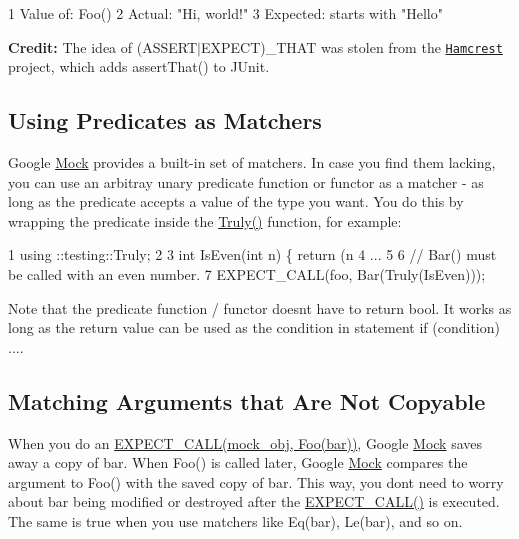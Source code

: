 \begin{DoxyCode}
1 Value of: Foo()
2   Actual: "Hi, world!"
3 Expected: starts with "Hello"
\end{DoxyCode}


{\bfseries Credit\+:} The idea of {\ttfamily (A\+S\+S\+E\+R\+T$\vert$\+E\+X\+P\+E\+CT)\+\_\+\+T\+H\+AT} was stolen from the \href{https://github.com/hamcrest/}{\tt Hamcrest} project, which adds {\ttfamily assert\+That()} to J\+Unit.

\subsection*{Using Predicates as Matchers}

Google \hyperlink{class_mock}{Mock} provides a built-\/in set of matchers. In case you find them lacking, you can use an arbitray unary predicate function or functor as a matcher -\/ as long as the predicate accepts a value of the type you want. You do this by wrapping the predicate inside the {\ttfamily \hyperlink{namespacetesting_a5faf05cfaae6074439960048e478b1c8}{Truly()}} function, for example\+:


\begin{DoxyCode}
1 using ::testing::Truly;
2 
3 int IsEven(int n) \{ return (n %
4 ...
5 
6   // Bar() must be called with an even number.
7   EXPECT\_CALL(foo, Bar(Truly(IsEven)));
\end{DoxyCode}


Note that the predicate function / functor doesn\textquotesingle{}t have to return {\ttfamily bool}. It works as long as the return value can be used as the condition in statement {\ttfamily if (condition) ...}.

\subsection*{Matching Arguments that Are Not Copyable}

When you do an {\ttfamily \hyperlink{gmock-spec-builders_8h_a535a6156de72c1a2e25a127e38ee5232}{E\+X\+P\+E\+C\+T\+\_\+\+C\+A\+L\+L(mock\+\_\+obj, Foo(bar))}}, Google \hyperlink{class_mock}{Mock} saves away a copy of {\ttfamily bar}. When {\ttfamily Foo()} is called later, Google \hyperlink{class_mock}{Mock} compares the argument to {\ttfamily Foo()} with the saved copy of {\ttfamily bar}. This way, you don\textquotesingle{}t need to worry about {\ttfamily bar} being modified or destroyed after the {\ttfamily \hyperlink{gmock-spec-builders_8h_a535a6156de72c1a2e25a127e38ee5232}{E\+X\+P\+E\+C\+T\+\_\+\+C\+A\+L\+L()}} is executed. The same is true when you use matchers like {\ttfamily Eq(bar)}, {\ttfamily Le(bar)}, and so on.

